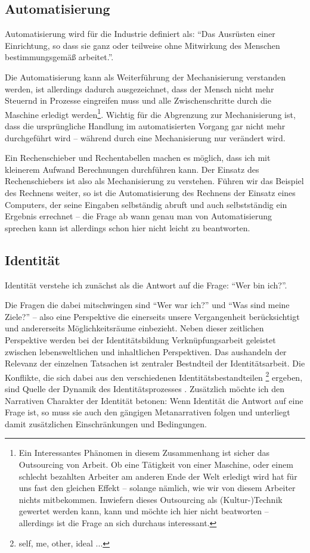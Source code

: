 \subsection {Automatisierung}

Automatisierung wird für die Industrie definiert als: \enquote{Das Ausrüsten einer Einrichtung, so dass sie ganz oder teilweise ohne Mitwirkung des Menschen bestimmungsgemäß arbeitet.}\parencite{din19233}.

Die Automatisierung kann als Weiterführung der Mechanisierung verstanden werden\parencite{ulrich}, ist allerdings dadurch ausgezeichnet, dass der Mensch nicht mehr Steuernd in Prozesse eingreifen muss und alle Zwischenschritte durch die Maschine erledigt werden\footnote{Ein Interessantes Phänomen in diesem Zusammenhang ist sicher das Outsourcing von Arbeit. Ob eine Tätigkeit von einer Maschine, oder einem schlecht bezahlten Arbeiter am anderen Ende der Welt erledigt wird hat für uns fast den gleichen Effekt – solange nämlich, wie wir von diesem Arbeiter nichts mitbekommen. Inwiefern dieses Outsourcing als (Kultur-)Technik gewertet werden kann, kann und möchte ich hier nicht beatworten – allerdings ist die Frage an sich durchaus interessant.}.
Wichtig für die Abgrenzung zur Mechanisierung ist, dass die ursprüngliche Handlung im automatisierten Vorgang gar nicht mehr durchgeführt wird – während durch eine Mechanisierung nur verändert wird.

Ein Rechenschieber und Rechentabellen machen es möglich, dass ich mit kleinerem Aufwand Berechnungen durchführen kann.
Der Einsatz des Rechenschiebers ist also als Mechanisierung zu verstehen.
Führen wir das Beispiel des Rechnens weiter, so ist die Automatisierung des Rechnens der Einsatz eines Computers, der seine Eingaben selbständig abruft und auch selbstständig ein Ergebnis errechnet – die Frage ab wann genau man von Automatisierung sprechen kann ist allerdings schon hier nicht leicht zu beantworten.

\subsection {Identität}
Identität verstehe ich zunächst als die Antwort auf die Frage: \enquote{Wer bin ich?}.

Die Fragen die dabei mitschwingen sind \enquote{Wer war ich?} und \enquote{Was sind meine Ziele?} – also eine Perspektive die einerseits unsere Vergangenheit berücksichtigt und andererseits Möglichkeitsräume einbezieht.
Neben dieser zeitlichen Perspektive werden bei der Identitätsbildung Verknüpfungsarbeit geleistet zwischen lebensweltlichen und inhaltlichen Perspektiven.
Das aushandeln der Relevanz der einzelnen Tatsachen ist zentraler Bestndteil der Identitätsarbeit.
Die Konflikte, die sich dabei aus den verschiedenen Identitätsbestandteilen \footnote{self, me, other, ideal ...} ergeben, sind Quelle der Dynamik des Identitätsprozesses \parencite{keupp}.
Zusätzlich möchte ich den Narrativen Charakter der Identität betonen:
Wenn Identität die Antwort auf eine Frage ist, so muss sie auch den gängigen Metanarrativen folgen und unterliegt damit zusätzlichen Einschränkungen und Bedingungen.

